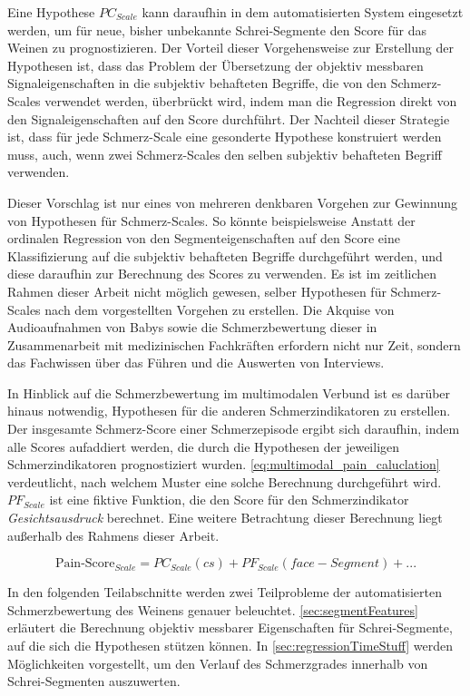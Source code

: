 Eine Hypothese $PC_{Scale}$ kann daraufhin in dem automatisierten System eingesetzt werden, um für neue, bisher unbekannte Schrei-Segmente den Score für das Weinen zu prognostizieren. Der Vorteil dieser Vorgehensweise zur Erstellung der Hypothesen ist, dass das Problem der Übersetzung der objektiv messbaren Signaleigenschaften in die subjektiv behafteten Begriffe, die von den Schmerz-Scales verwendet werden, überbrückt wird, indem man die Regression direkt von den Signaleigenschaften auf den Score durchführt. Der Nachteil dieser Strategie ist, dass für jede Schmerz-Scale eine gesonderte Hypothese konstruiert werden muss, auch, wenn zwei Schmerz-Scales den selben subjektiv behafteten Begriff verwenden.

Dieser Vorschlag ist nur eines von mehreren denkbaren Vorgehen zur Gewinnung von Hypothesen für Schmerz-Scales. So könnte beispielsweise Anstatt der ordinalen Regression von den Segmenteigenschaften auf den Score eine Klassifizierung auf die subjektiv behafteten Begriffe durchgeführt werden, und diese daraufhin zur Berechnung des Scores zu verwenden. Es ist im zeitlichen Rahmen dieser Arbeit nicht möglich gewesen, selber Hypothesen für Schmerz-Scales nach dem vorgestellten Vorgehen zu erstellen. Die Akquise von Audioaufnahmen von Babys sowie die Schmerzbewertung dieser in Zusammenarbeit mit medizinischen Fachkräften erfordern nicht nur Zeit, sondern das Fachwissen über das Führen und die Auswerten von Interviews. 

In Hinblick auf die Schmerzbewertung im multimodalen Verbund ist es darüber hinaus notwendig, Hypothesen für die anderen Schmerzindikatoren zu erstellen. Der insgesamte Schmerz-Score einer Schmerzepisode ergibt sich daraufhin, indem alle Scores aufaddiert werden, die durch die Hypothesen der jeweiligen Schmerzindikatoren prognostiziert wurden. \autoref{eq:multimodal_pain_caluclation} verdeutlicht, nach welchem Muster eine solche Berechnung durchgeführt wird. $PF_{Scale}$ ist eine fiktive Funktion, die den Score für den Schmerzindikator \emph{Gesichtsausdruck} berechnet. Eine weitere Betrachtung dieser Berechnung liegt außerhalb des Rahmens dieser Arbeit. 

\begin{equation}
\text{Pain-Score}_{Scale} = PC_{Scale}(cs) + PF_{Scale}(face-Segment) + ...
\label{eq:multimodal_pain_caluclation}
\end{equation}


In den folgenden Teilabschnitte werden zwei Teilprobleme der automatisierten Schmerzbewertung des Weinens genauer beleuchtet. \autoref{sec:segmentFeatures} erläutert die Berechnung objektiv messbarer Eigenschaften für Schrei-Segmente, auf die sich die Hypothesen stützen können. In \autoref{sec:regressionTimeStuff} werden Möglichkeiten vorgestellt, um den Verlauf des Schmerzgrades innerhalb von Schrei-Segmenten auszuwerten.


